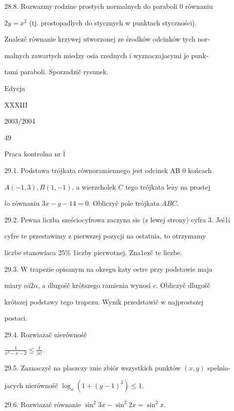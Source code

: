 \documentclass[a4paper,12pt]{article}
\begin{document}
28.8. Rozwazmy rodzine prostych normalnych do paraboli $0$ równaniu

$2y = x^{2}$ (tj. prostopadlych do stycznych $\mathrm{w}$ punktach styczności).

Znalez$\acute{}$č równanie krzywej utworzonej ze środków odcinków tych nor-

malnych zawartych miedzy osia rzednych $\mathrm{i}$ wyznaczajacymi je punk-

tami paraboli. Sporzadzič rysunek.





Edycja

XXXIII

2003/2004





49

Praca kontrolna nr l

29.1. Podstawa trójkata równoramiennego jest odcinek AB $0$ końcach

$A(-1,3), B(1,-1)$, a wierzcholek $C$ tego trójkata $\mathrm{l}\mathrm{e}\dot{\mathrm{z}}\mathrm{y}$ na prostej

$l\mathrm{o}$ równaniu $3x-y-14=0$. Obliczyč pole trójkata $ABC.$

29.2. Pewna liczba sześciocyfrowa zaczyna $\mathrm{s}\mathrm{i}\mathrm{e}$ ($\mathrm{z}$ lewej strony) cyfra 3. Jeś1i

cyfre $\mathrm{t}\mathrm{e}$ przestawimy $\mathrm{z}$ pierwszej pozycji na ostatnia, to otrzymamy

liczbe stanowiaca 25\% 1iczby pierwotnej. Zna1ez$\acute{}$č $\mathrm{t}\mathrm{e}$ liczbe.

29.3. $\mathrm{W}$ trapezie opisanym na okregu katy ostre przy podstawie maja

miary $\alpha \mathrm{i}2\alpha$, a dlugośč krótszego ramienia wynosi $c$. Obliczyč dlugośč

krótszej podstawy tego trapezu. Wynik przedstawič $\mathrm{w}$ najprostszej

postaci.

29.4. Rozwiazač nierównośč

$\displaystyle \frac{1}{x^{2}-x-2}\leq\frac{1}{|x|}.$

29.5. Zaznaczyč na plaszczy $\acute{\mathrm{z}}\mathrm{n}\mathrm{i}\mathrm{e}$ zbiór wszystkich punktów $(x,y)$ spelnia-

jacych nierównośč $\log_{x}(1+(y-1)^{3})\leq 1.$

29.6. Rozwiazač równanie $\sin^{2}3x-\sin^{2}2x=\sin^{2}x.$
\end{document}
